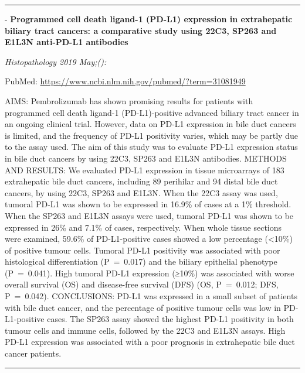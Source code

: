 \documentclass[]{article}
\begin{document}
{}

{}

\begin{center}\rule{0.5\linewidth}{\linethickness}\end{center}

 - \textbf{Programmed cell death ligand-1 (PD-L1) expression in
extrahepatic biliary tract cancers: a comparative study using 22C3,
SP263 and E1L3N anti-PD-L1 antibodies}

\emph{Histopathology 2019 May;():}

PubMed: \url{https://www.ncbi.nlm.nih.gov/pubmed/?term=31081949}

AIMS: Pembrolizumab has shown promising results for patients with
programmed cell death ligand-1 (PD-L1)-positive advanced biliary tract
cancer in an ongoing clinical trial. However, data on PD-L1 expression
in bile duct cancers is limited, and the frequency of PD-L1 positivity
varies, which may be partly due to the assay used. The aim of this study
was to evaluate PD-L1 expression status in bile duct cancers by using
22C3, SP263 and E1L3N antibodies. METHODS AND RESULTS: We evaluated
PD-L1 expression in tissue microarrays of 183 extrahepatic bile duct
cancers, including 89 perihilar and 94 distal bile duct cancers, by
using 22C3, SP263 and E1L3N. When the 22C3 assay was used, tumoral PD-L1
was shown to be expressed in 16.9\% of cases at a 1\% threshold. When
the SP263 and E1L3N assays were used, tumoral PD-L1 was shown to be
expressed in 26\% and 7.1\% of cases, respectively. When whole tissue
sections were examined, 59.6\% of PD-L1-positive cases showed a low
percentage (\textless{}10\%) of positive tumour cells. Tumoral PD-L1
positivity was associated with poor histological differentiation
(P~=~0.017) and the biliary epithelial phenotype (P~=~0.041). High
tumoral PD-L1 expression (≥10\%) was associated with worse overall
survival (OS) and disease-free survival (DFS) (OS, P~=~0.012; DFS,
P~=~0.042). CONCLUSIONS: PD-L1 was expressed in a small subset of
patients with bile duct cancer, and the percentage of positive tumour
cells was low in PD-L1-positive cases. The SP263 assay showed the
highest PD-L1 positivity in both tumour cells and immune cells, followed
by the 22C3 and E1L3N assays. High PD-L1 expression was associated with
a poor prognosis in extrahepatic bile duct cancer patients.

{}

{}

\begin{center}\rule{0.5\linewidth}{\linethickness}\end{center}
\end{document}
